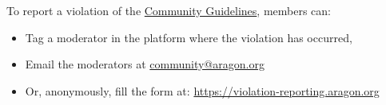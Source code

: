 To report a violation of the \hyperref[chap:CommunityGuidelines]{Community Guidelines}, members can:
\begin{itemize}
	\item Tag a moderator in the platform where the violation has occurred,
	\item Email the moderators at \href{community@aragon.org}{community@aragon.org}
	\item Or, anonymously, fill the form at: \href{https://violation-reporting.aragon.org}{https://violation-reporting.aragon.org}
\end{itemize}

